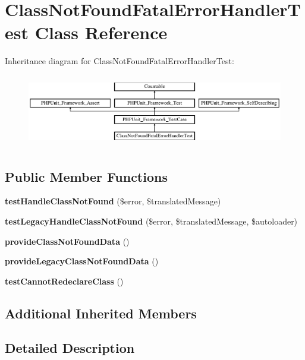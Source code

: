 \section{Class\+Not\+Found\+Fatal\+Error\+Handler\+Test Class Reference}
\label{class_symfony_1_1_component_1_1_debug_1_1_tests_1_1_fatal_error_handler_1_1_class_not_found_fatal_error_handler_test}
Inheritance diagram for Class\+Not\+Found\+Fatal\+Error\+Handler\+Test\+:\begin{figure}[H]
\begin{center}
\leavevmode
\includegraphics[height=3.218391cm]{class_symfony_1_1_component_1_1_debug_1_1_tests_1_1_fatal_error_handler_1_1_class_not_found_fatal_error_handler_test}
\end{center}
\end{figure}
\subsection*{Public Member Functions}
\begin{DoxyCompactItemize}
\item 
{\bf test\+Handle\+Class\+Not\+Found} (\$error, \$translated\+Message)
\item 
{\bf test\+Legacy\+Handle\+Class\+Not\+Found} (\$error, \$translated\+Message, \$autoloader)
\item 
{\bf provide\+Class\+Not\+Found\+Data} ()
\item 
{\bf provide\+Legacy\+Class\+Not\+Found\+Data} ()
\item 
{\bf test\+Cannot\+Redeclare\+Class} ()
\end{DoxyCompactItemize}
\subsection*{Additional Inherited Members}


\subsection{Detailed Description}


